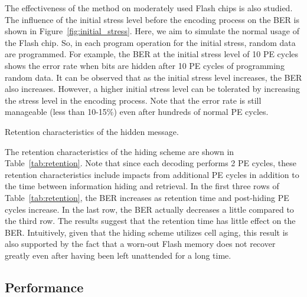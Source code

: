The effectiveness of the method on moderately used Flash chips is also
studied. The influence of the initial stress level before the encoding
process on the BER is shown in Figure~\ref{fig:initial_stress}. 
Here, we aim to simulate the normal usage of the Flash chip. 
So, in each program operation for the initial stress, random data are 
programmed. For example, the BER at the initial stress level of 10 PE 
cycles shows the error rate when bits are hidden after 10 PE cycles of
programming random data.
It can be observed that as the initial stress level increases, 
the BER also increases. 
However, a higher initial stress level can be tolerated by increasing
the stress level in the encoding process.
Note that the error rate is still manageable (less than 10-15\%) even 
after hundreds of normal PE cycles.

\begin{table}
  \begin{center}
    
  \end{center}
\vspace{-0.1in}
\caption{Retention characteristics of the hidden message.}
\label{tab:retention}
\vspace{-0.2in}
\end{table}


The retention characteristics of the hiding scheme are shown 
in Table~\ref{tab:retention}. Note that since each decoding 
performs 2 PE cycles, these retention characteristics include
impacts from additional PE cycles in addition to the time
between information hiding and retrieval.
In the first three rows of Table~\ref{tab:retention}, the BER
increases as retention time and post-hiding PE cycles increase. 
In the last row, the BER actually decreases a little compared to the 
third row. 
The results suggest that the retention time has little effect on
the BER.
Intuitively, given that the hiding scheme utilizes cell aging, 
this result is also supported by the fact that a worn-out Flash
memory does not recover greatly even after having been left
unattended for a long time. 


\subsection{Performance}
\label{sec:perf}


